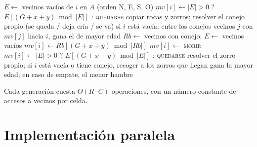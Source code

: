 \documentclass[11pt,a4paper]{article}
\begin{document}
\begin{algorithm}[H]
\caption{Una generación $G$ (cada bucle recorre un rango de filas)}
\begin{algorithmic}[1]
 
  \State $E \gets$ vecinos vacíos de $i$ en $A$ (orden N, E, S, O)
  \State $mv[i] \gets |E|>0$ ? $E[(G+x+y) \bmod |E|]$ : \textsc{quedarse}
\EndFor
{} 
  \State copiar rocas y zorros; resolver el conejo propio (se queda / deja cría / se va)
  \State si $i$ está vacía: entre los conejos vecinos $j$ con $mv[j]$ hacia $i$, gana el de mayor edad
\EndFor
{} 
  \State $Rb \gets$ vecinos con conejo; $E \gets$ vecinos vacíos
   $mv[i] \gets Rb[(G+x+y) \bmod |Rb|]$
   $mv[i] \gets$ \textsc{morir}
  \Else\ $mv[i] \gets |E|>0$ ? $E[(G+x+y) \bmod |E|]$ : \textsc{quedarse}
  \EndIf
\EndFor
{} 
  \State resolver el zorro propio; si $i$ está vacía o tiene conejo, recoger a los zorros que llegan
  \State gana la mayor edad; en caso de empate, el menor hambre
\EndFor
\end{algorithmic}
\end{algorithm}

Cada generación cuesta $\Theta(R\cdot C)$ operaciones, con un número constante de accesos a vecinos por celda.

\section{Implementación paralela}
\end{document}
